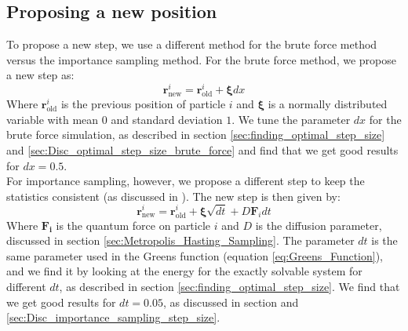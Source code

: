 \documentclass[a4paper, 10pt]{article}
\begin{document}
	\subsection{Proposing a new position}
	To propose a new step, we use a different method for the brute force method versus the importance sampling method. For the brute force method, we propose a new step as:
	\begin{equation}
	\boldsymbol{r}^i_{\mathrm{new}}=\boldsymbol{r}^i_{\mathrm{old}}+\boldsymbol{\xi} dx
	\end{equation}
	Where $\boldsymbol{r}^i_{\mathrm{old}}$ is the previous position of particle $i$ and $\boldsymbol{\xi}$ is a normally distributed variable with mean $0$ and standard deviation $1$. We tune the parameter $dx$ for the brute force simulation, as described in section \ref{sec:finding_optimal_step_size} and \ref{sec:Disc_optimal_step_size_brute_force} and find that we get good results for $dx=0.5$.\\
	\linebreak
	For importance sampling, however, we propose a different step to keep the statistics consistent (as discussed in \cite{Hjorth-Jensen2015}). The new step is then given by:
	\begin{equation}
	\boldsymbol{r}^i_{\mathrm{new}}=\boldsymbol{r}^i_{\mathrm{old}}+\boldsymbol{\xi} \sqrt{dt}+D\boldsymbol{F}_idt
	\end{equation}
	Where $\boldsymbol{F_i}$ is the quantum force on particle $i$ and $D$ is the diffusion parameter, discussed in section \ref{sec:Metropolis_Hasting_Sampling}. The parameter $dt$ is the same parameter used in the Greens function (equation \ref{eq:Greens_Function}), and we find it by looking at the energy for the exactly solvable system for different $dt$, as described in section \ref{sec:finding_optimal_step_size}. We find that we get good results for $dt=0.05$, as discussed in section and \ref{sec:Disc_importance_sampling_step_size}.
\end{document}
